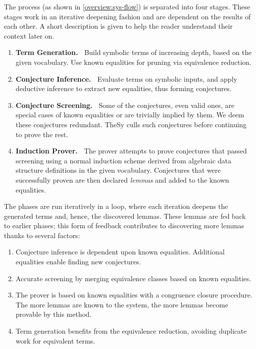 The process (as shown in \autoref{overview:sys-flow}) is separated into four stages.
These stages work in an iterative deepening fashion and are dependent on the results of each other. A short description is given to help the reader understand their context later on.
\begin{enumerate}[leftmargin=1.2em]
    \item \textbf{Term Generation.~} Build symbolic terms of increasing depth, based on the given vocabulary.
    Use known equalities for pruning via equivalence reduction.
    \item \textbf{Conjecture Inference.~} Evaluate terms on symbolic inputs, and apply deductive inference to extract new equalities, thus forming conjectures.
    \item \textbf{Conjecture Screening.~} Some of the conjectures, even valid ones, are special cases of known equalities or are trivially implied by them. We deem these conjectures redundant.
    TheSy culls such conjectures before continuing to prove the rest.
    \item \textbf{Induction Prover.~} The prover attempts to prove conjectures that passed screening using a normal induction scheme derived from algebraic data structure definitions in the given vocabulary.
    Conjectures that were successfully proven are then declared \emph{lemmas} and added to the known equalities.
\end{enumerate}


The phases are run iteratively in a loop, where each iteration deepens the generated terms and, hence, the discovered lemmas.
These lemmas are fed back to earlier phases;
this form of feedback contributes to discovering more lemmas thanks to several factors:
\begin{enumerate}[label=(\roman*), align=left, labelsep=0pt,labelwidth=2em]
\item Conjecture inference is dependent upon known equalities. Additional equalities enable finding new conjectures.
\item Accurate screening by merging equivalence classes based on known equalities. 
\item The prover is based on known equalities with a congruence closure procedure. 
The more lemmas are known to the system, the more lemmas become provable by this method.
\item Term generation benefits from the equivalence reduction, avoiding duplicate work for equivalent terms. 
\end{enumerate}


